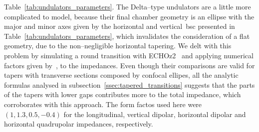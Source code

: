     Table~\ref{tab:undulators_parameters}. The Delta--type undulators are a little more complicated to model, because their final chamber geometry is an ellipse with the major and minor axes given by the horizontal and vertical~\gls{bsc} presented in Table~\ref{tab:undulators_parameters}, which invalidates the consideration of a flat geometry, due to the non--negligible horizontal tapering. We delt with this problem by simulating a round transition with ECHOz2~\cite{Zagorodnov2005} and applying numerical factors given by~, to the impedances. Even though their comparisons are valid for tapers with transverse sections composed by confocal ellipes, all the analytic formulas analysed in
    subsection~\ref{ssec:tapered_transitions} suggests that the parts of the tapers with lower gaps contributes more to the total impedance, which corroborates with this approach. The form factos used here were $(1,1.3,0.5,-0.4)$ for the longitudinal, vertical dipolar, horizontal dipolar and horizontal quadrupolar impedances, respectively.

